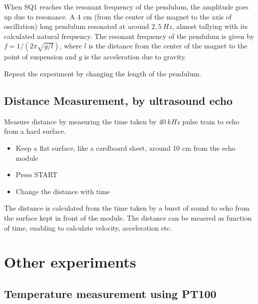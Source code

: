 \documentclass[a4paper,12pt,english]{sphinxmanual}
\let\sphinxpxdimen\pdfpxdimen\else\newdimen\sphinxpxdimen
\begin{document}

When SQ1 reaches the resonant frequency of the pendulum, the amplitude
goes up due to resonance. A 4 cm (from the center of the magnet to the
axis of oscillation) long pendulum resonated at around \(2,5~Hz\), almost
tallying with its calculated natural frequency. The resonant frequency
of the pendulum is given by \(f = 1/(2\pi\sqrt{g/l})\), where \(l\) is the
distance from the center of the magnet to the point of suspension and \(g\)
is the acceleration due to gravity.

Repeat the experiment by changing the length of the pendulum.


\section{Distance Measurement, by ultrasound echo}
\label{\detokenize{6.4:distance-measurement-by-ultrasound-echo}}\label{\detokenize{6.4::doc}}

Measure distance by measuring the time taken by \(40~kHz\) pulse train to
echo from a hard surface.


\noindent\sphinxincludegraphics[width=300\sphinxpxdimen]{{sr04-dist}.pdf}
\begin{itemize}
\item {} 
Keep a flat surface, like a cardboard sheet, around 10 cm from the
echo module

\item {} 
Press START

\item {} 
Change the distance with time

\end{itemize}


The distance is calculated from the time taken by a burst of sound to
echo from the surface kept in front of the module. The distance can be
measred as function of time, enabling to calculate velocity,
acceleration etc.


\chapter{Other experiments}
\label{\detokenize{index:other-experiments}}

\section{Temperature measurement using PT100}
\label{\detokenize{7.1:temperature-measurement-using-pt100}}\label{\detokenize{7.1::doc}}
\end{document}
